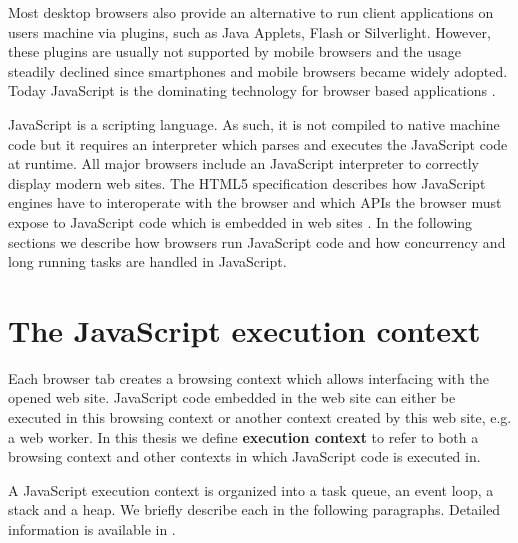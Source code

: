 \documentclass[
	ruledheaders=section,%
	class=report,%
	thesis={type=bachelor},%
	accentcolor=9c,%
	custommargins=true,%
	marginpar=false,%
	parskip=half-,%
	fontsize=11pt,%
]{tudapub}
\begin{document}
  Most desktop browsers also provide an alternative to run client applications on users machine via plugins, such as Java Applets, Flash or Silverlight. However, these plugins are usually not supported by mobile browsers and the usage steadily declined since smartphones and mobile browsers became widely adopted. Today JavaScript is the dominating technology for browser based applications \cite{browser-plugin-usage}.

  JavaScript is a scripting language. As such, it is not compiled to native machine code but it requires an interpreter which parses and executes the JavaScript code at runtime. All major browsers include an JavaScript interpreter to correctly display modern web sites. The HTML5 specification describes how JavaScript engines have to interoperate with the browser and which APIs the browser must expose to JavaScript code which is embedded in web sites \cite{html5-specification}.
  In the following sections we describe how browsers run JavaScript code and how concurrency and long running tasks are handled in JavaScript.

  \section{The JavaScript execution context}

  Each browser tab creates a browsing context which allows interfacing with the opened web site. JavaScript code embedded in the web site can either be executed in this browsing context or another context created by this web site, e.g. a web worker. In this thesis we define \textbf{execution context} to refer to both a browsing context and other contexts in which JavaScript code is executed in.

  A JavaScript execution context is organized into a task queue, an event loop, a stack and a heap. We briefly describe each in the following paragraphs. Detailed information is available in \cite{mdn-event-loop}.
\end{document}
